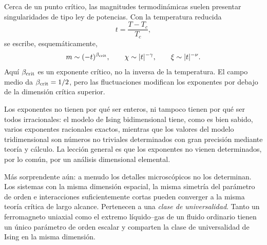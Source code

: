 Cerca de un punto crítico, las magnitudes termodinámicas suelen presentar singularidades de tipo ley de potencias. Con la temperatura reducida
\begin{equation}
t=\frac{T-T_c}{T_c},
\end{equation}
se escribe, esquemáticamente,
\begin{equation}
m\sim(-t)^{\beta_{\rm crit}},
\qquad
\chi\sim |t|^{-\gamma},
\qquad
\xi\sim |t|^{-\nu}.
\label{eq:critical-exponents}
\end{equation}
Aquí \(\beta_{\rm crit}\) es un exponente crítico, no la inversa de la temperatura. El campo medio da \(\beta_{\rm crit}=1/2\), pero las fluctuaciones modifican los exponentes por debajo de la dimensión crítica superior.

Los exponentes no tienen por qué ser enteros, ni tampoco tienen por qué ser todos irracionales: el modelo de Ising bidimensional tiene, como es bien sabido, varios exponentes racionales exactos, mientras que los valores del modelo tridimensional son números no triviales determinados con gran precisión mediante teoría y cálculo. La lección general es que los exponentes no vienen determinados, por lo común, por un análisis dimensional elemental.

Más sorprendente aún: a menudo los detalles microscópicos no los determinan. Los sistemas con la misma dimensión espacial, la misma simetría del parámetro de orden e interacciones suficientemente cortas pueden converger a la misma teoría crítica de largo alcance. Pertenecen a una \emph{clase de universalidad}. Tanto un ferromagneto uniaxial como el extremo líquido--gas de un fluido ordinario tienen un único parámetro de orden escalar y comparten la clase de universalidad de Ising en la misma dimensión.

\begin{classroomqa}
\end{classroomqa}


